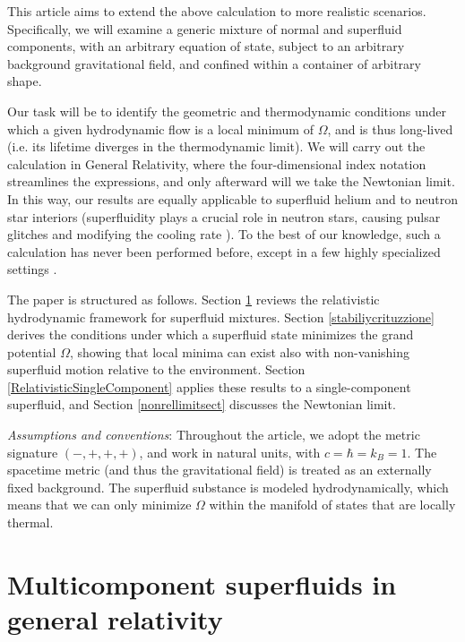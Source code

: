\documentclass[a4paper, amsfonts, amssymb, amsmath, reprint, showkeys, nofootinbib, twoside,notitlepage,onecolumn]{revtex4-2}
\theoremstyle{definition}
\theoremstyle{theorem}
\theoremstyle{corollary}
\begin{document}
This article aims to extend the above calculation to more realistic scenarios. Specifically, we will examine a generic mixture of normal and superfluid components, with an arbitrary equation of state, subject to an arbitrary background gravitational field, and confined within a container of arbitrary shape. {\color{black}Our task will be to identify the geometric and thermodynamic conditions under which a given hydrodynamic flow is a local minimum of $\Omega$, and is thus long-lived (i.e. its lifetime diverges in the thermodynamic limit). We will carry out the calculation in General Relativity, where the four-dimensional index notation streamlines the expressions, and only afterward will we take the Newtonian limit. In this way, our results are equally applicable to superfluid helium and to neutron star interiors (superfluidity plays a crucial role in neutron stars, causing pulsar glitches and modifying the cooling rate \cite{andersson2007review,Page2014}). To the best of our knowledge, such a calculation has never been performed before, except in a few highly specialized settings \cite{Andreev2004,Haber:2015exa,Gouteraux:2022qix,Arean:2023nnn,Hoult:2024cyx}. 

The paper is structured as follows. Section \ref{section2} reviews the relativistic hydrodynamic framework for superfluid mixtures. Section \ref{stabiliycrituzzione} derives the conditions under which a superfluid state minimizes the grand potential $\Omega$, showing that local minima can exist also with non-vanishing superfluid motion relative to the environment. Section \ref{RelativisticSingleComponent} applies these results to a single-component superfluid, and Section \ref{nonrellimitsect} discusses the Newtonian limit.}


\textit{Assumptions and conventions}: Throughout the article, we adopt the metric signature $(-,+,+,+)$, and work in natural units, with $c=\hbar=k_B=1$. The spacetime metric (and thus the gravitational field) is treated as an externally fixed background. The superfluid substance is modeled hydrodynamically, which means that we can only minimize $\Omega$ within the manifold of states that are locally thermal. 

\vspace{-0.2cm}
\section{Multicomponent superfluids in general relativity}\label{section2}
\vspace{-0.2cm}
\end{document}
